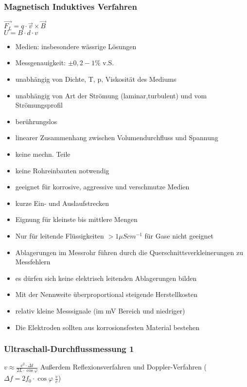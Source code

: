 \documentclass[a4paper]{scrartcl}
\begin{document}
\subsubsection{Magnetisch Induktives Verfahren}
$\vec{F_L} = q \cdot \vec{v} \times \vec{B}$\\
$U = B \cdot d \cdot v$
\begin{itemize}
\item Medien: insbesondere wässrige Lösungen
\item Messgenauigkeit: $\pm 0,2 - 1 \% $ v.S.
\item unabhängig von Dichte, T, p, Viskosität des Mediums
\item unabhängig von Art der Strömung (laminar,turbulent) und vom Strömungsprofil
\item berührungslos
\item linearer Zusammenhang zwischen Volumendurchfluss und Spannung
\item keine mechn. Teile
\item keine Rohreinbauten notwendig
\item geeignet für korrosive, aggressive und verschmutze Medien
\item kurze Ein- und Auslaufstrecken
\item Eignung für kleinste bis mittlere Mengen
\item Nur für leitende Flüssigkeiten $> 1 \mu S cm^{-1}$ für Gase nicht geeignet
\item Ablagerungen im Messrohr führen durch die Querschnittsverkleinerungen zu Messfehlern
\item es dürfen sich keine elektrisch leitenden Ablagerungen bilden
\item Mit der Nennweite überproportional steigende Herstellkosten
\item relativ kleine Messsignale (im mV Bereich und niedriger)
\item Die Elektroden sollten aus korrosionsfesten Material bestehen
\end{itemize}

\subsubsection{Ultraschall-Durchflussmessung 1} $v\approx \frac{c^2 \cdot \Delta t}{2L \cdot \cos{\varphi}}$ 
Außerdem Reflexionsverfahren und Doppler-Verfahren ($\Delta f = 2 f_0 \cdot \cos{\varphi}\; \frac{v}{c}$)
\end{document}
